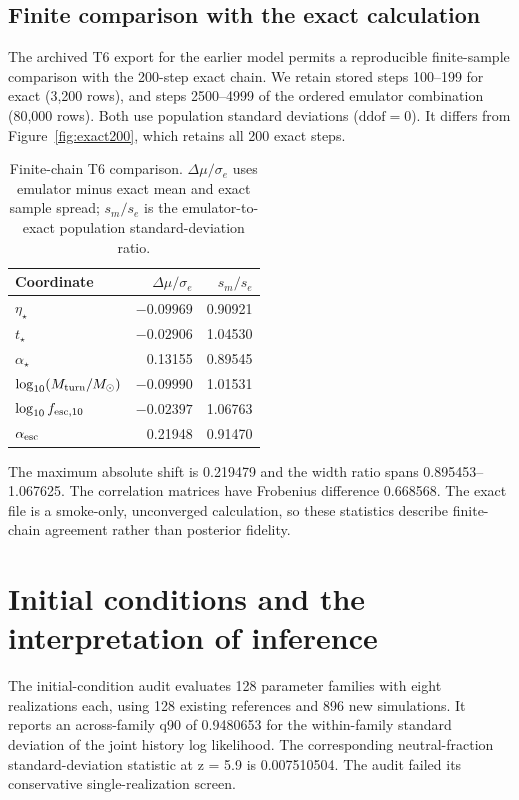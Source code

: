 \subsection{Finite comparison with the exact calculation}

The archived T6 export for the earlier model permits a reproducible finite-sample comparison with the 200-step exact chain. We retain stored steps 100--199 for exact (3,200 rows), and steps 2500--4999 of the ordered emulator combination (80,000 rows). Both use population standard deviations ($\mathrm{ddof}=0$). It differs from Figure~\ref{fig:exact200}, which retains all 200 exact steps.

\begin{table}[t]\centering\small
\caption{Finite-chain T6 comparison. $\Delta\mu/\sigma_e$ uses emulator minus exact mean and exact sample spread; $s_m/s_e$ is the emulator-to-exact population standard-deviation ratio.}\label{tab:t6}
\begin{tabular}{lrr}\toprule
Coordinate & $\Delta\mu/\sigma_e$ & $s_m/s_e$\\\midrule
$\eta_\star$ & $-0.09969$ & 0.90921\\
$t_\star$ & $-0.02906$ & 1.04530\\
$\alpha_\star$ & 0.13155 & 0.89545\\
$\log_{10}(M_{\rm turn}/M_\odot)$ & $-0.09990$ & 1.01531\\
$\log_{10}f_{{\rm esc},10}$ & $-0.02397$ & 1.06763\\
$\alpha_{\rm esc}$ & 0.21948 & 0.91470\\\bottomrule
\end{tabular}\end{table}

The maximum absolute shift is 0.219479 and the width ratio spans 0.895453--1.067625. The correlation matrices have Frobenius difference 0.668568. The exact file is a smoke-only, unconverged calculation, so these statistics describe finite-chain agreement rather than posterior fidelity.


\section{Initial conditions and the interpretation of inference}\label{initial-condition-scatter-and-limits-of-inference}\label{validation-plan}

The initial-condition audit evaluates 128 parameter families with eight realizations each, using 128 existing references and 896 new simulations. It reports an across-family q90 of 0.9480653 for the within-family standard deviation of the joint history log likelihood. The corresponding neutral-fraction standard-deviation statistic at z = 5.9 is 0.007510504. The audit failed its conservative single-realization screen.

